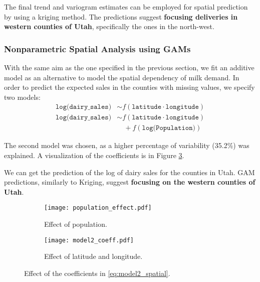 
The final trend and variogram estimates can be employed for spatial prediction by using a kriging method. The predictions suggest \textbf{focusing deliveries in western counties of Utah}, specifically the ones in the north-west.



\subsubsection{Nonparametric Spatial Analysis using GAMs}

With the same aim as the one specified in the previous section, we fit an additive model as an alternative to model the spatial dependency of milk demand. In order to predict the expected sales in the counties with missing values, we specify two models:
\begin{equation}
    \begin{aligned}
    \texttt{log(dairy\_sales)} &\sim f(\texttt{latitude} \cdot \texttt{longitude})
    \end{aligned}
    \tag{Model 1}
\end{equation}
\begin{equation}
    \begin{aligned}
    \texttt{log(dairy\_sales)} &\sim f(\texttt{latitude} \cdot \texttt{longitude})\\
    & \quad + f(\texttt{log(Population)})
    \end{aligned}
    \tag{Model 2}
    \label{eq:model2_spatial}
\end{equation}

The second model was chosen, as a higher percentage of variability (35.2\%) was explained. A visualization of the coefficients is in Figure \ref{fig:coefficients_model2_spatial}.

We can get the prediction of the log of dairy sales for the counties in Utah. GAM predictions, similarly to Kriging, suggest \textbf{focusing on the western counties of Utah}.


\begin{figure}[H]
\centering
\begin{subfigure}{.4\textwidth}
  \centering
  \texttt{[image: population\_effect.pdf]}
  \caption{Effect of population.}
  \label{fig:sub1}
\end{subfigure}%
\begin{subfigure}{.6\textwidth}
  \centering
  \texttt{[image: model2\_coeff.pdf]}
  \caption{Effect of latitude and longitude.}
  \label{fig:sub2}
\end{subfigure}
\caption{Effect of the coefficients in \ref{eq:model2_spatial}.}
\label{fig:coefficients_model2_spatial}
\end{figure}

